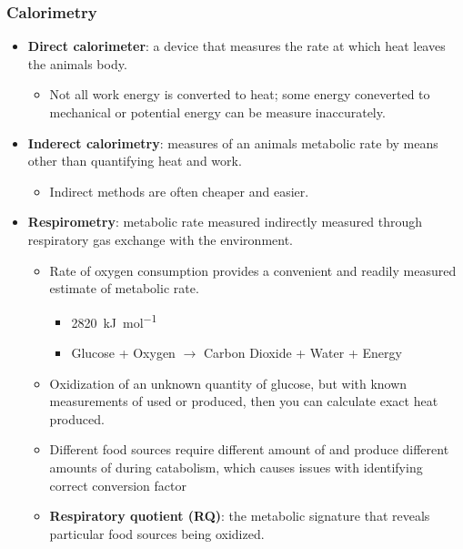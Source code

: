 \documentclass[12pt,a4paper]{article}
\begin{document}
\begin{itemize}
    \subsubsection{Calorimetry}
    \begin{itemize}
        \item \textbf{Direct calorimeter}: a device that measures the rate at which heat leaves the animals body.
            \begin{itemize}
                \item Not all work energy is converted to heat; some energy coneverted to mechanical or potential energy can be measure inaccurately.
            \end{itemize}
        \item \textbf{Inderect calorimetry}: measures of an animals metabolic rate by means other than quantifying heat and work.
            \begin{itemize}
                \item Indirect methods are often cheaper and easier.
            \end{itemize}
        \item \textbf{Respirometry}: metabolic rate measured indirectly measured through respiratory gas exchange with the environment.
            \begin{itemize}
                \item Rate of oxygen consumption provides a convenient and readily measured estimate of metabolic rate.
                    \begin{itemize}
                        \item {} \SI{2820}{kJ\per\mol}
                        \item Glucose + Oxygen \(\rightarrow\) Carbon Dioxide + Water + Energy
                    \end{itemize}
                \item Oxidization of an unknown quantity of glucose, but with known measurements of  used or  produced, then you can calculate exact heat produced.
                \item Different food sources require different amount of  and produce different amounts of  during catabolism, which causes issues with identifying correct conversion factor
                \item \textbf{Respiratory quotient (RQ)}: the metabolic signature that reveals particular food sources being oxidized.

\end{itemize}
\end{itemize}
\end{itemize}
\end{document}
